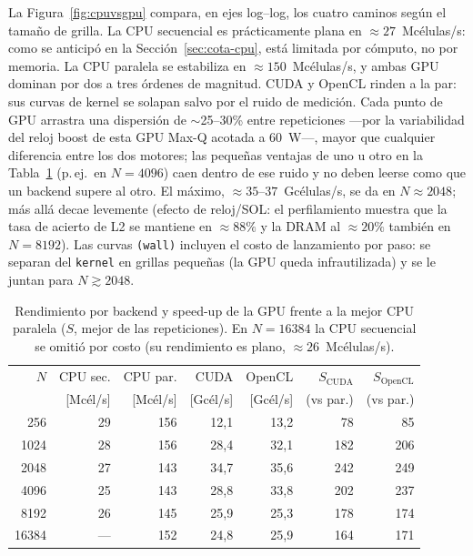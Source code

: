 \documentclass[
	spanish,
	letterpaper, oneside
]{article}
\begin{document}
La Figura~\ref{fig:cpuvsgpu} compara, en ejes log--log, los cuatro caminos según el
tamaño de grilla. La CPU secuencial es prácticamente plana en $\approx
27$~Mcélulas/s: como se anticipó en la Sección~\ref{sec:cota-cpu}, está limitada por
cómputo, no por memoria. La CPU paralela se estabiliza en $\approx 150$~Mcélulas/s, y
ambas GPU dominan por dos a tres órdenes de magnitud. CUDA y OpenCL
rinden a la par: sus curvas de kernel se solapan salvo por el ruido de
medición. Cada punto de GPU arrastra una dispersión de $\sim$25--30\% entre
repeticiones ---por la variabilidad del reloj boost de esta GPU Max-Q acotada a
60~W---, mayor que cualquier diferencia entre los dos motores; las pequeñas ventajas
de uno u otro en la Tabla~\ref{tab:cpugpu} (p.\,ej.\ en $N{=}4096$) caen dentro de ese
ruido y no deben leerse como que un backend supere al otro. El máximo,
$\approx 35$--$37$~Gcélulas/s, se da en $N\approx2048$; más allá decae levemente
(efecto de reloj/SOL: el perfilamiento muestra que la tasa de acierto de L2 se
mantiene en $\approx88\%$ y la DRAM al $\approx20\%$ también en $N=8192$). Las curvas
\texttt{(wall)} incluyen el costo de lanzamiento por paso: se separan del
\texttt{kernel} en grillas pequeñas (la GPU queda infrautilizada) y se le juntan para
$N \gtrsim 2048$.


\begin{table}[H]
	\centering
	\caption{Rendimiento por backend y speed-up de la GPU frente a la mejor CPU
	paralela ($S$, mejor de las repeticiones). En $N{=}16384$ la CPU secuencial se
	omitió por costo (su rendimiento es plano, $\approx 26$~Mcélulas/s).}
	\label{tab:cpugpu}
	\begin{tabular}{@{}rrrrrrr@{}}
		\toprule
		$N$ & CPU sec. & CPU par. & CUDA & OpenCL & $S_{\text{CUDA}}$ & $S_{\text{OpenCL}}$ \\
		    & [Mcél/s] & [Mcél/s] & [Gcél/s] & [Gcél/s] & (vs par.) & (vs par.) \\
		\midrule
		256   & 29  & 156 & 12{,}1 & 13{,}2 & 78  & 85  \\
		1024  & 28  & 156 & 28{,}4 & 32{,}1 & 182 & 206 \\
		2048  & 27  & 143 & 34{,}7 & 35{,}6 & 242 & 249 \\
		4096  & 25  & 143 & 28{,}8 & 33{,}8 & 202 & 237 \\
		8192  & 26  & 145 & 25{,}9 & 25{,}3 & 178 & 174 \\
		16384 & --- & 152 & 24{,}8 & 25{,}9 & 164 & 171 \\
		\bottomrule
	\end{tabular}
\end{table}
\end{document}
